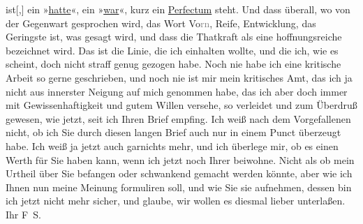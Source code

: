 \begin{ledgroupsized}[t]{13cm}
                  ist{[},{]} ein »\uline{hatte}«, ein »\uline{war}«, kurz ein \uline{Perfectum} steht. Und dass überall, wo von der Gegenwart gesprochen wird, das
               Wort Vo\textcolor{gray}{rn}, Reife, Entwicklung, das Geringste ist, was gesagt wird,
               und dass die Thatkraft als eine hoffnungsreiche bezeichnet wird. Das ist die Linie,
               die ich einhalten wollte, und die ich, wie es scheint, doch nicht straff genug
               gezogen habe.\pend
           \pstart
           Noch nie habe ich eine kritische Arbeit so gerne geschrieben, und noch nie ist mir
               mein kritisches Amt, das ich ja nicht aus innerster Neigung auf mich genommen habe,
               das ich aber doch immer mit Gewissenhaftigkeit und gutem Willen versehe, so verleidet
               und zum Überdruß gewesen, wie jetzt, seit ich Ihren Brief empfing.\pend
           \pstart
           Ich weiß nach dem Vorgefallenen nicht, ob ich Sie durch diesen langen Brief auch nur
               in einem Punct überzeugt habe. Ich weiß ja jetzt auch garnichts mehr, und ich
               überlege mir, ob es einen Werth für Sie haben kann, wenn ich jetzt noch Ihrer \label{K_L03353-11v}\label{K_L03353-11h} beiwohne. Nicht als ob mein Urtheil über Sie befangen oder schwankend gemacht
               werden könnte, aber wie ich Ihnen nun meine Meinung formuliren soll, und wie Sie sie
               aufnehmen, dessen bin ich jetzt nicht mehr sicher, und glaube, wir wollen es diesmal
               lieber unterlaßen.\pend
           \pstart Ihr \spacefill\mbox{F S.}\pend{}
         
         \endnumbering{}\end{ledgroupsized}  \newcommand{\dateiname}{L03353}\newcommand{\titel}{Felix Salten an Arthur Schnitzler, [9. 11. 1903]}\newcommand{\editorInnen}{Martin Anton Müller und Laura Untner}
      